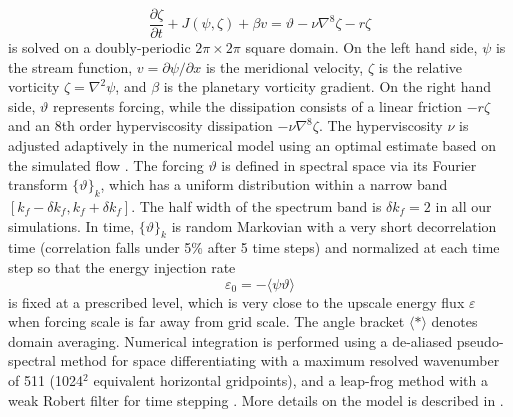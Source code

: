 \documentclass{ametsoc}
\begin{document}
\begin{equation}
\frac{\partial\zeta}{\partial t}+J(\psi,\zeta)+\beta v=\vartheta-\nu\nabla^{8}\zeta-r\zeta\label{eq:barotropic_vorticity_eq}
\end{equation}
is solved on a doubly-periodic $2\pi\times2\pi$ square domain. On
the left hand side, $\psi$ is the stream function, $v=\partial\psi/\partial x$
is the meridional velocity, $\zeta$ is the relative vorticity $\zeta=\nabla^{2}\psi$,
and $\beta$ is the planetary vorticity gradient. On the right hand
side, $\vartheta$ represents forcing, while the dissipation consists
of a linear friction $-r\zeta$ and an 8th order hyperviscosity dissipation
$-\nu\nabla^{8}\zeta$. The hyperviscosity $\nu$ is adjusted adaptively
in the numerical model using an optimal estimate based on the simulated
flow \citep{Maltrud1991,Smith2002}. The forcing $\vartheta$ is defined
in spectral space via its Fourier transform $\{\vartheta\}_{k}$,
which has a uniform distribution within a narrow band $[k_{f}-\delta k_{f},k_{f}+\delta k_{f}]$.
The half width of the spectrum band is $\delta k_{f}=2$ in all our
simulations. In time, $\{\vartheta\}_{k}$ is random Markovian with
a very short decorrelation time (correlation falls under 5\% after
5 time steps) and normalized at each time step so that the energy
injection rate
\begin{equation}
\varepsilon_{0}=-\langle\psi\vartheta\rangle\label{eq:energy_injection_rate}
\end{equation}
is fixed at a prescribed level, which is very close to the upscale
energy flux $\varepsilon$ when forcing scale is far away from grid
scale. The angle bracket $\langle*\rangle$ denotes domain averaging.
Numerical integration is performed using a de-aliased pseudo-spectral
method for space differentiating with a maximum resolved wavenumber
of 511 (1024$^{2}$ equivalent horizontal gridpoints), and a leap-frog
method with a weak Robert filter for time stepping \citep{Patterson1971}.
More details on the model is described in \citet{Smith2002}.
\end{document}
